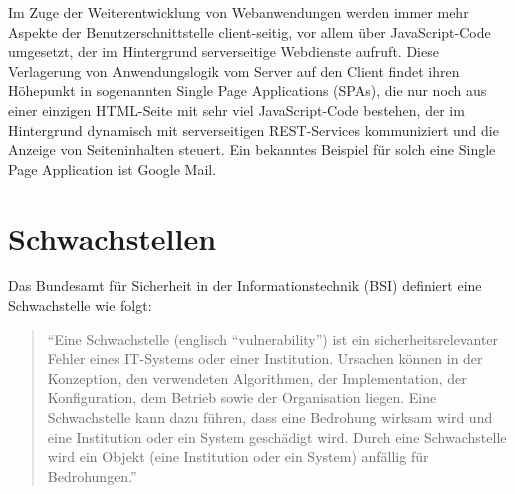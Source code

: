 \documentclass[12pt,oneside,a4paper,parskip]{scrbook}
\begin{document}
  Im Zuge der Weiterentwicklung von Webanwendungen werden immer mehr Aspekte der Benutzerschnittstelle client-seitig, vor allem über JavaScript-Code umgesetzt, der im Hintergrund serverseitige Webdienste aufruft.
  Diese Verlagerung von Anwendungslogik vom Server auf den Client findet ihren Höhepunkt in sogenannten Single Page Applications (SPAs), die nur noch aus einer einzigen HTML-Seite mit sehr viel JavaScript-Code bestehen, der im Hintergrund dynamisch mit serverseitigen REST-Services kommuniziert und die Anzeige von Seiteninhalten steuert. Ein bekanntes Beispiel für solch eine Single Page Application ist Google Mail.
  \cite{Rohr}
  \newpage

 \section{Schwachstellen}
  Das Bundesamt für Sicherheit in der Informationstechnik (BSI) definiert eine Schwachstelle wie folgt:

  \begin{quote}``Eine Schwachstelle (englisch ``vulnerability'') ist ein sicherheitsrelevanter Fehler eines IT-Systems oder einer Institution. Ursachen können in der Konzeption, den verwendeten Algorithmen, der Implementation, der Konfiguration, dem Betrieb sowie der Organisation liegen. Eine Schwachstelle kann dazu führen, dass eine Bedrohung wirksam wird und eine Institution oder ein System geschädigt wird. Durch eine Schwachstelle wird ein Objekt (eine Institution oder ein System) anfällig für Bedrohungen.'' \cite{BSI2}
  \end{quote}
\end{document}
